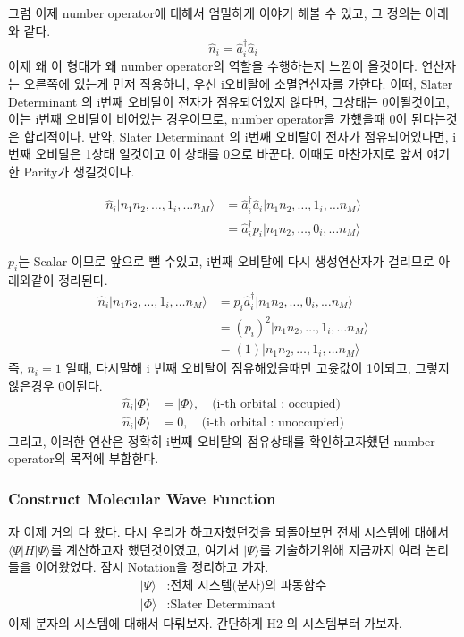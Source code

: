 \documentclass[11pt]{article}
\begin{document}
그럼 이제 number operator에 대해서 엄밀하게 이야기 해볼 수 있고, 그 정의는 아래와 같다. 
\[
\hat{n}_i = \hat{a}_i^{\dagger}\hat{a}_i
\]
이제 왜 이 형태가 왜 number operator의 역할을 수행하는지 느낌이 올것이다. 
연산자는 오른쪽에 있는게 먼저 작용하니, 우선 i오비탈에 소멸연산자를 가한다. 이때, Slater Determinant 의 i번째 오비탈이 전자가 점유되어있지 않다면, 그상태는 0이될것이고, 
이는 i번째 오비탈이 비어있는 경우이므로, number operator을 가했을때 0이 된다는것은 합리적이다. 
만약, Slater Determinant 의 i번째 오비탈이 전자가 점유되어있다면, i번째 오비탈은 1상태 일것이고 이 상태를 0으로 바꾼다. 
이때도 마찬가지로 앞서 얘기한 Parity가 생길것이다.

\begin{align*}
\hat{n}_i\vert n_1 n_2 ,\dots, 1_i ,\dots n_M \rangle &=\hat{a}_i^{\dagger}\hat{a}_i \vert n_1 n_2 ,\dots, 1_i ,\dots n_M \rangle \\
&= \hat{a}_i^{\dagger} p_i \vert n_1 n_2 ,\dots, 0_i ,\dots n_M \rangle
\end{align*}

\(p_i\)는 Scalar 이므로 앞으로 뺄 수있고, i번째 오비탈에 다시 생성연산자가 걸리므로 아래와같이 정리된다. 
\begin{align*}
\hat{n}_i\vert n_1 n_2 ,\dots, 1_i ,\dots n_M \rangle &=p_i \hat{a}_i^{\dagger}  \vert n_1 n_2 ,\dots, 0_i ,\dots n_M \rangle \\
&= (p_i)^2 \vert n_1 n_2 ,\dots, 1_i ,\dots n_M \rangle \\
&= (1) \vert n_1 n_2 ,\dots, 1_i ,\dots n_M \rangle
\end{align*}
즉, \(n_i = 1\) 일때, 다시말해 i 번째 오비탈이 점유해있을때만 고윳값이 1이되고, 그렇지 않은경우 0이된다. 
\begin{align*}
\hat{n}_i \vert \Phi \rangle &= \vert \Phi \rangle , \quad \text{(i-th orbital : occupied)}\\
\hat{n}_i \vert \Phi \rangle &= 0 , \quad \text{(i-th orbital : unoccupied)}
\end{align*}
그리고, 이러한 연산은 정확히 i번째 오비탈의 점유상태를 확인하고자했던 number operator의 목적에 부합한다. 


\subsubsection{Construct Molecular Wave Function}
자 이제 거의 다 왔다. 다시 우리가 하고자했던것을 되돌아보면 전체 시스템에 대해서 \(\langle \Psi|H|\Psi \rangle\)를 계산하고자 했던것이였고, 
여기서 \(|\Psi \rangle \)를 기술하기위해 지금까지 여러 논리들을 이어왔었다. 
잠시 Notation을 정리하고 가자. 
\begin{align*}
| \Psi \rangle &: \text{전체 시스템(분자)의 파동함수}\\
| \Phi \rangle &: \text{Slater Determinant}
\end{align*}
이제 분자의 시스템에 대해서 다뤄보자. 
간단하게 H2 의 시스템부터 가보자. 
\end{document}
